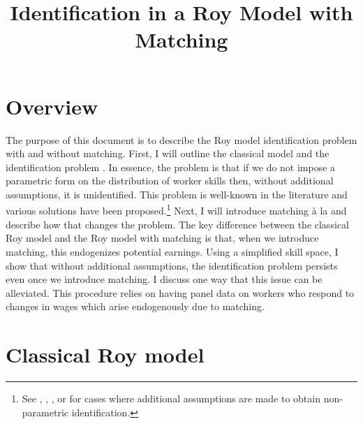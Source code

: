 \documentclass[12 pt]{article}
\title{Identification in a Roy Model with Matching}
\author{}
\date{}
\begin{document}
\maketitle
\vspace*{-2cm}
\onehalfspacing

\section{Overview}

The purpose of this document is to describe the Roy model identification problem with and without matching. First, I will outline the classical \citet{roy1951some} model and the identification problem \citep{heckman1990empirical}. In essence, the problem is that if we do not impose a parametric form on the distribution of worker skills then, without additional assumptions, it is unidentified. This problem is well-known in the literature and various solutions have been proposed.\footnote{See \citet{heckman1990empirical}, \citet{bayer2011nonparametric}, \citet{buera2006non}, or \citet{mourifie2020sharp} for cases where additional assumptions are made to obtain non-parametric identification.} Next, I will introduce matching \`{a} la \citet{mak2025occupational} and describe how that changes the problem. The key difference between the classical Roy model and the Roy model with matching is that, when we introduce matching, this endogenizes potential earnings. Using a simplified skill space, I show that without additional assumptions, the identification problem \citep{heckman1990empirical} persists even once we introduce matching. I discuss one way that this issue can be alleviated. This procedure relies on having panel data on workers who respond to changes in wages which arise endogenously due to matching.

\section{Classical Roy model}
\end{document}
